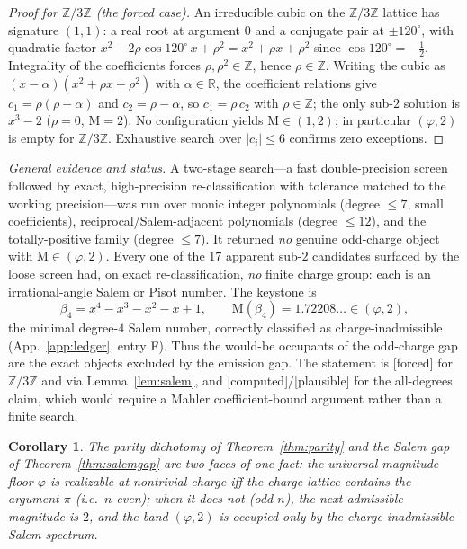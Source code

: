 \documentclass[11pt]{article}
\newtheorem{corollary}[theorem]{Corollary}
\theoremstyle{definition}
\theoremstyle{remark}
\newcommand{\Mah}{\mathrm{M}}
\newcommand{\Z}{\mathbb{Z}}
\newcommand{\R}{\mathbb{R}}
\newcommand{\gold}{\varphi}
\newcommand{\Zmod}[1]{\Z/#1\Z}
\newcommand{\status}[1]{{\small\textsf{[#1]}}}
\newcommand{\forced}{\status{forced}}
\newcommand{\computed}{\status{computed}}
\newcommand{\plausible}{\status{plausible}}
\begin{document}
\begin{proof}[Proof for $\Zmod3$ (the forced case)]
An irreducible cubic on the $\Zmod3$ lattice has signature $(1,1)$: a real root at argument
$0$ and a conjugate pair at $\pm120^\circ$, with quadratic factor
$x^2-2\rho\cos120^\circ\,x+\rho^2=x^2+\rho x+\rho^2$ since $\cos120^\circ=-\tfrac12$.
Integrality of the coefficients forces $\rho,\rho^2\in\Z$, hence $\rho\in\Z$. Writing the
cubic as $(x-\alpha)(x^2+\rho x+\rho^2)$ with $\alpha\in\R$, the coefficient relations give
$c_1=\rho(\rho-\alpha)$ and $c_2=\rho-\alpha$, so $c_1=\rho\,c_2$ with $\rho\in\Z$; the only
sub-$2$ solution is $x^3-2$ ($\rho=0$, $\Mah=2$). No configuration yields
$\Mah\in(1,2)$; in particular $(\gold,2)$ is empty for $\Zmod3$. Exhaustive search over
$|c_i|\le6$ confirms zero exceptions.
\end{proof}

\noindent\emph{General evidence and status.} A two-stage search---a fast double-precision
screen followed by exact, high-precision re-classification with tolerance matched to the
working precision---was run over monic integer polynomials (degree $\le7$, small
coefficients), reciprocal/Salem-adjacent polynomials (degree $\le12$), and the
totally-positive family (degree $\le7$). It returned \emph{no} genuine odd-charge object with
$\Mah\in(\gold,2)$. Every one of the $17$ apparent sub-$2$ candidates surfaced by the loose
screen had, on exact re-classification, \emph{no} finite charge group: each is an
irrational-angle Salem or Pisot number. The keystone is
\[
\beta_4=x^4-x^3-x^2-x+1,\qquad \Mah(\beta_4)=1.72208\ldots\in(\gold,2),
\]
the minimal degree-$4$ Salem number, correctly classified as charge-inadmissible
(App.~\ref{app:ledger}, entry F). Thus the would-be occupants of the odd-charge gap are the
exact objects excluded by the emission gap. The statement is \forced{} for $\Zmod3$ and via
Lemma~\ref{lem:salem}, and \computed{}/\plausible{} for the all-degrees claim, which would
require a Mahler coefficient-bound argument rather than a finite search.

\begin{corollary}
The parity dichotomy of Theorem~\ref{thm:parity} and the Salem gap of
Theorem~\ref{thm:salemgap} are two faces of one fact: the universal magnitude floor $\gold$
is realizable at nontrivial charge \emph{iff} the charge lattice contains the argument $\pi$
(i.e.\ $n$ even); when it does not (odd $n$), the next admissible magnitude is $2$, and the
band $(\gold,2)$ is occupied only by the charge-inadmissible Salem spectrum.
\end{corollary}
\end{document}

